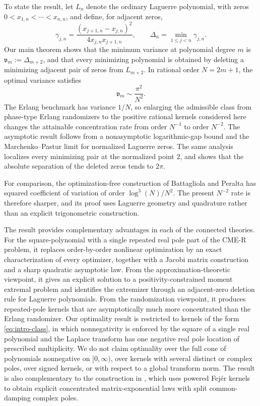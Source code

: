 \documentclass[11pt]{article}
\numberwithin{equation}{section}
\theoremstyle{definition}
\theoremstyle{remark}
\newcommand{\Lag}{L}
\begin{document}
To state the result, let $\Lag_n$ denote the ordinary Laguerre polynomial,
with zeros $0<x_{1,n}<\cdots<x_{n,n}$,
and define, for adjacent zeros,
\begin{equation}
\label{eq:deltas_intro}
 {\gamma_{j,n}}
=
\frac{(x_{j+1,n}-x_{j,n})^2}
{4x_{j,n}x_{j+1,n}},
\qquad
\Delta_n
=
\min_{1\leq j<n}{\gamma_{j,n}}. 
\end{equation}
Our main theorem shows that the minimum variance at polynomial degree $m$ is
$\mathfrak v_m:=\Delta_{m+2}$, and that every minimizing polynomial is obtained by deleting
a minimizing adjacent pair of zeros from $\Lag_{m+2}$. In rational order
$N=2m+1$, the optimal variance satisfies
$$
\mathfrak v_m\sim\frac{\pi^2}{N^2}.
$$
The Erlang benchmark has variance $1/N$, so enlarging the admissible class
from phase-type Erlang randomizers to the positive rational kernels considered
here changes the attainable concentration rate from order $N^{-1}$ to order
$N^{-2}$. The asymptotic result follows from a nonasymptotic logarithmic-gap
bound and the Marchenko--Pastur limit for normalized Laguerre zeros. The
same analysis localizes every minimizing pair at the normalized point $2$,
and shows that the absolute separation of the deleted zeros tends to
$2\pi$.

For comparison, the optimization-free construction of Battagliola and
Peralta \cite{battagliolaperalta2026} has squared coefficient of variation of
order $\log^3(N)/N^2$. The present $N^{-2}$ rate is therefore sharper, and its proof uses Laguerre geometry and quadrature
rather than an explicit trigonometric construction.

The result provides complementary advantages in each of the connected
theories. For the square-polynomial with a single repeated real pole part of the CME-R problem, it replaces order-by-order nonlinear
optimization by an exact characterization of every optimizer, together with
a Jacobi matrix construction and a sharp quadratic asymptotic law.
From the approximation-theoretic viewpoint, it gives an explicit solution
to a positivity-constrained moment extremal problem and identifies the
extremizer through an adjacent-zero deletion rule for Laguerre polynomials.
From the randomization viewpoint, it produces repeated-pole kernels that are
asymptotically much more concentrated than the Erlang randomizer. Our optimality result is restricted to kernels of the form \eqref{eq:intro-class}, in which nonnegativity is enforced by the square of a single real polynomial and the Laplace transform has one negative real pole location of prescribed multiplicity. We do not
claim optimality over the full cone of polynomials nonnegative on
$[0,\infty)$, over kernels with several distinct or complex poles, over
signed kernels, or with respect to a global transform norm. The result is
also complementary to the construction in
\cite{battagliolaperalta2026}, which uses powered Fej\'er kernels to obtain
explicit concentrated matrix-exponential laws with split
common-damping complex poles.
\end{document}
